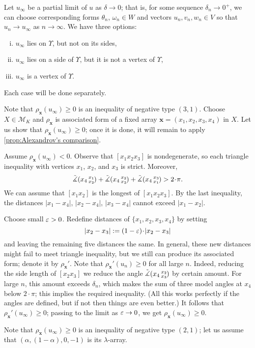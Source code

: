 \documentclass[a4paper,10pt]{article}
\begin{document}
Let $u_\infty$ be a partial limit of $u$ as $\delta\to 0$;
that is, for some sequence $\delta_n\to 0^+$, we can choose corresponding forms $\theta_n$, $\omega_n\in W$ and vectors $u_n,v_n,w_n\in V$
so that $u_n\to u_\infty$ as $n\to\infty$.
We have three options:
\begin{enumerate}[(i)]
\item\label{in} $u_\infty$ lies on $\Upsilon$, but not on its sides,
\item\label{side}$u_\infty$ lies on a side of $\Upsilon$, but it is not a vertex of $\Upsilon$,
\item\label{vertex} $u_\infty$ is a vertex of $\Upsilon$.
\end{enumerate}
Each case will be done separately.

Note that $\rho_{\bm{x}}(u_\infty)\ge0$ is an inequality of negative type $(3,1)$.
Choose $X\in \mathcal{M}_K$ and $\rho_{\bm{x}}$ is associated form of a fixed array $\bm{x}=(x_1, x_2, x_3, x_4)$ in $X$.
Let us show that $\rho_{\bm{x}}(u_\infty)\ge0$;
once it is done, it will remain to apply \ref{prop:Alexandrov's comparison}.

Assume $\rho_{\bm{x}}(u_\infty)<0$.
Observe that $[x_1x_2x_3]$ is nondegenerate, so each triangle inequality with vertices $x_1$, $x_2$, and $x_3$ is strict.
Moreover,
\[\angk{x_4}{x_1}{x_2}+\angk{x_4}{x_2}{x_3}+\angk{x_4}{x_3}{x_1}>2\cdot\pi.\]
We can assume that $[x_1x_2]$ is the longest of $[x_1x_2x_3]$.
By the last inequality, the distances $|x_1-x_4|$, $|x_2-x_4|$, $|x_3-x_4|$ cannot exceed $|x_1-x_2|$.

Choose small $\varepsilon>0$.
Redefine distances of $\{x_1,x_2,x_3,x_4\}$ by setting
\[|x_2-x_3|\z{\mathrel{:=}}(1-\eps)\cdot|x_2-x_3|\]
and leaving the remaining five distances the same.
In general, these new distances might fail to meet triangle inequality, but we still can produce its associated form;
denote it by $\rho_{\bm{x}}'$.
Note that $\rho_{\bm{x}}'(u_n)\ge0$ for all large $n$.
Indeed, reducing the side length of $[x_2x_3]$ we reduce the angle $\tilde\measuredangle(x_4\,{}^{x_2}_{x_3}\hspace{-0.2ex})$ by certain amount.
For large $n$, this amount exceeds $\delta_n$, which makes the sum of three model angles at $x_4$ below $2\cdot \pi$; this implies the required inequality.
(All this works perfectly if the angles are defined, but if not then things are even better.)
It follows that $\rho_{\bm{x}}'(u_\infty)\ge0$;
passing to the limit as $\varepsilon\to 0$, we get $\rho_{\bm{x}}(u_\infty)\ge0$.

Note that $\rho_{\bm{x}}(u_\infty)\ge0$ is an inequality of negative type $(2,1)$;
let us assume that $(\alpha,(1-\alpha), 0,-1)$ is its $\lambda$-array.
\end{document}
